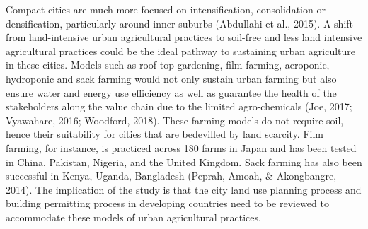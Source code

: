 Compact cities are much more focused on intensification, consolidation or densification, particularly around inner suburbs (Abdullahi et al., 2015). A shift from land-intensive urban agricultural practices to soil-free and less land intensive agricultural practices could be the ideal pathway to sustaining urban agriculture in these cities. Models such as roof-top gardening, film farming, aeroponic, hydroponic and sack farming would not only sustain urban farming but also ensure water and energy use efficiency as well as guarantee the health of the stakeholders along the value chain due to the limited agro-chemicals (Joe, 2017; Vyawahare, 2016; Woodford, 2018). These farming models do not require soil, hence their suitability for cities that are bedevilled by land scarcity. Film farming, for instance, is practiced across 180 farms in Japan and has been tested in China, Pakistan, Nigeria, and the United Kingdom. Sack farming has also been successful in Kenya, Uganda, Bangladesh (Peprah, Amoah, \& Akongbangre, 2014). The implication of the study is that the city land use planning process and building permitting process in developing countries need to be reviewed to accommodate these models of urban agricultural practices.


